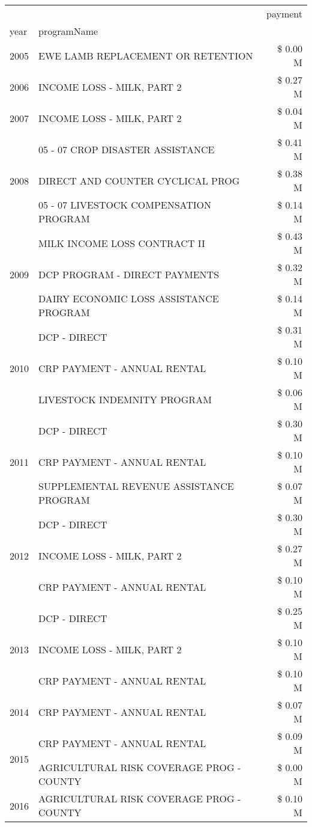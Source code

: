 \begin{tabular}{llr}
\toprule
 &  & payment \\
year & programName &  \\
\midrule
2005 & EWE LAMB REPLACEMENT OR RETENTION & \$ 0.00 M \\
\cline{1-3}
2006 & INCOME LOSS - MILK, PART 2 & \$ 0.27 M \\
\cline{1-3}
2007 & INCOME LOSS - MILK, PART 2 & \$ 0.04 M \\
\cline{1-3}
\multirow[t]{3}{*}{2008} & 05 - 07 CROP DISASTER ASSISTANCE & \$ 0.41 M \\
 & DIRECT AND COUNTER CYCLICAL PROG & \$ 0.38 M \\
 & 05 - 07 LIVESTOCK COMPENSATION PROGRAM & \$ 0.14 M \\
\cline{1-3}
\multirow[t]{3}{*}{2009} & MILK INCOME LOSS CONTRACT II & \$ 0.43 M \\
 & DCP PROGRAM - DIRECT PAYMENTS & \$ 0.32 M \\
 & DAIRY ECONOMIC LOSS ASSISTANCE PROGRAM & \$ 0.14 M \\
\cline{1-3}
\multirow[t]{3}{*}{2010} & DCP - DIRECT & \$ 0.31 M \\
 & CRP PAYMENT - ANNUAL RENTAL & \$ 0.10 M \\
 & LIVESTOCK INDEMNITY PROGRAM & \$ 0.06 M \\
\cline{1-3}
\multirow[t]{3}{*}{2011} & DCP - DIRECT & \$ 0.30 M \\
 & CRP PAYMENT - ANNUAL RENTAL & \$ 0.10 M \\
 & SUPPLEMENTAL REVENUE ASSISTANCE PROGRAM & \$ 0.07 M \\
\cline{1-3}
\multirow[t]{3}{*}{2012} & DCP - DIRECT & \$ 0.30 M \\
 & INCOME LOSS - MILK, PART 2 & \$ 0.27 M \\
 & CRP PAYMENT - ANNUAL RENTAL & \$ 0.10 M \\
\cline{1-3}
\multirow[t]{3}{*}{2013} & DCP - DIRECT & \$ 0.25 M \\
 & INCOME LOSS - MILK, PART 2 & \$ 0.10 M \\
 & CRP PAYMENT - ANNUAL RENTAL & \$ 0.10 M \\
\cline{1-3}
2014 & CRP PAYMENT - ANNUAL RENTAL & \$ 0.07 M \\
\cline{1-3}
\multirow[t]{2}{*}{2015} & CRP PAYMENT - ANNUAL RENTAL & \$ 0.09 M \\
 & AGRICULTURAL RISK COVERAGE PROG - COUNTY & \$ 0.00 M \\
\cline{1-3}
\multirow[t]{3}{*}{2016} & AGRICULTURAL RISK COVERAGE PROG - COUNTY & \$ 0.10 M \\

\end{tabular}
